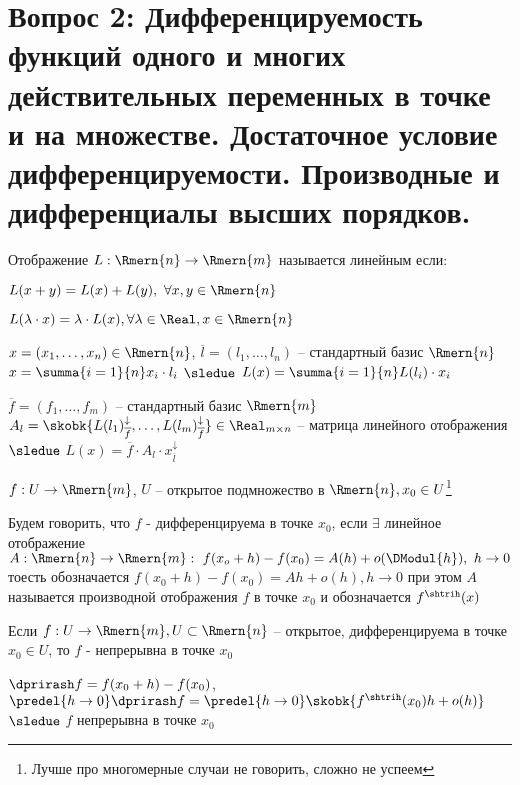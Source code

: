 \section{Вопрос 2: Дифференцируемость функций одного и многих действительных переменных
в точке и на множестве. Достаточное условие дифференцируемости.
Производные и дифференциалы высших порядков.}



\begin{defs}
	Отображение $L: \Rmern{n}\to\Rmern{m}$ называется линейным если:
	\begin{enumerate*}
		\item $L(x+y)= L(x) + L(y), \ \forall x,y \in \Rmern{n}$
		\item $L(\lambda \cdot x) = \lambda \cdot L(x), \forall
		\lambda \in \Real,  x\in \Rmern{n}$
	\end{enumerate*}

	\begin{enumerate*}
		\item $x = (x_1, \ldots, x_n) \in \Rmern{n}$, $\overline{l} = (l_1,\ldots,l_n)$ -- стандартный базис $\Rmern{n}$ $x = \summa{i=1}{n}x_i \cdot l_i$ $\sledue$ $L(x) = \summa{i=1}{n}L(l_i)\cdot x_i$

		\item $\overline{f}= (f_1,\ldots,f_m)$ -- стандартный базис $\Rmern{m}$ $A_l = \skobk{L(l_1)^{\downarrow}_{\overline{f}},\ldots,L(l_m)^{\downarrow}_{\overline{f}}} \in \Real_{m \times n}$ -- матрица линейного отображения $\sledue$ $L(x) = \overline{f} \cdot A_l \cdot x_{\overline{l}}^{\downarrow}$
	\end{enumerate*}
\end{defs}

\begin{defs}
	$f: U \to \Rmern{m}$, $U$ -- открытое подмножество в $\Rmern{n}, x_0 \in U$\footnote{Лучше про многомерные случаи не говорить, сложно не успеем}

	Будем говорить, что $f$ - дифференцируема в точке $x_0$, если $\exists$ линейное отображение $A: \Rmern{n} \to \Rmern{m}: \ f(x_o + h) - f(x_0)= A(h) + o(\DModul{h}), \ h \to 0$ тоесть обозначается $f(x_0 + h)-f(x_0)=Ah+o(h), h\to 0$ при этом $A$ называется производной отображения $f$ в точке $x_0$ и обозначается $f^{\shtrih}(x)$
\end{defs}

\begin{claim}
	\begin{enumerate*}
		\item Если $f: U \to \Rmern{m}, U \subset \Rmern{n}$ -- открытое, дифференцируема в точке $x_0 \in U$, то $f$ - непрерывна в точке $x_0$
		\begin{dokvo}
			$\dprirash f = f(x_0 + h) - f(x_0)$, $\predel{h \to 0} \dprirash f = \predel{h \to 0}\skobk{f^{\shtrih}(x_0)h + o(h)}$ $\sledue$ $f$ непрерывна в точке $x_0$
		\end{dokvo}
	\end{enumerate*}
\end{claim}

